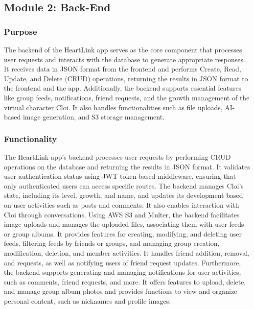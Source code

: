 \documentclass[conference]{IEEEtran}
\begin{document}
    \subsection{Module 2: Back-End}
        \subsubsection{Purpose} 
            The backend of the HeartLink app serves as the core component that processes user requests and interacts with the database to generate appropriate responses. It receives data in JSON format from the frontend and performs Create, Read, Update, and Delete (CRUD) operations, returning the results in JSON format to the frontend and the app.
            Additionally, the backend supports essential features like group feeds, notifications, friend requests, and the growth management of the virtual character Cloi. It also handles functionalities such as file uploads, AI-based image generation, and S3 storage management.\\
            \vspace{3mm}
        \subsubsection{Functionality}
            The HeartLink app's backend processes user requests by performing CRUD operations on the database and returning the results in JSON format. It validates user authentication status using JWT token-based middleware, ensuring that only authenticated users can access specific routes. The backend manages Cloi’s state, including its level, growth, and name, and updates its development based on user activities such as posts and comments. It also enables interaction with Cloi through conversations.
            Using AWS S3 and Multer, the backend facilitates image uploads and manages the uploaded files, associating them with user feeds or group albums. It provides features for creating, modifying, and deleting user feeds, filtering feeds by friends or groups, and managing group creation, modification, deletion, and member activities. It handles friend addition, removal, and requests, as well as notifying users of friend request updates.
            Furthermore, the backend supports generating and managing notifications for user activities, such as comments, friend requests, and more. It offers features to upload, delete, and manage group album photos and provides functions to view and organize personal content, such as nicknames and profile images.\\
            \vspace{3mm}
\end{document}
